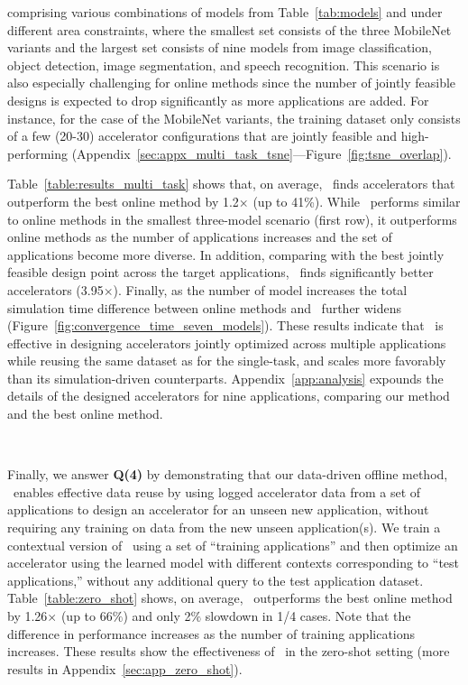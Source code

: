 %
%
comprising various combinations of models from Table~\ref{tab:models} and under different area constraints, where the smallest set consists of the three MobileNet variants and the largest set consists of nine models from image classification, object detection, image segmentation, and speech recognition.
%
This scenario is also especially challenging for online methods since the number of jointly feasible designs is expected to drop significantly as more applications are added.
%
For instance, for the case of the MobileNet variants, the training dataset only consists of a few (20-30) accelerator configurations that are jointly feasible and high-performing (Appendix~\ref{sec:appx_multi_task_tsne}---Figure~\ref{fig:tsne_overlap}). 

Table~\ref{table:results_multi_task} shows that, on average, \primemethodname\ finds accelerators that outperform the best online method by 1.2$\times$ (up to 41\%).
%
While \primemethodname\ performs similar to online methods in the smallest three-model scenario (first row), it outperforms online methods as the number of applications increases and the set of applications become more diverse.
%
In addition, comparing with the best jointly feasible design point across the target applications, \primemethodname\ finds significantly better accelerators (3.95$\times$).
%
Finally, as the number of model increases the total simulation time difference between online methods and \primemethodname\ further widens (Figure~\ref{fig:convergence_time_seven_models}).
%
These results indicate that \primemethodname\ is effective in designing accelerators jointly optimized across multiple applications while reusing the same dataset as for the single-task, and scales more favorably than its simulation-driven counterparts.
%
Appendix~\ref{app:analysis} expounds the details of the designed accelerators for nine applications, comparing our method and the best online method.

~

%
Finally, we answer \textbf{Q(4)} by demonstrating that our data-driven offline method, \primemethodname\ enables effective data reuse by using logged accelerator data from a set of applications to design an accelerator for an unseen new application, without requiring any training on data from the new unseen application(s).
%
We train a contextual version of \primemethodname\ using a set of ``training applications'' and then optimize an accelerator using the learned model with different contexts corresponding to ``test applications,'' without any additional query to the test application dataset.
%
Table~\ref{table:zero_shot} shows, on average, \primemethodname\ outperforms the best online method by 1.26$\times$ (up to 66$\%$) and only 2$\%$ slowdown in 1/4 cases.
%
Note that the difference in performance increases as the number of training applications increases.
%
These results show the effectiveness of \primemethodname\ in the zero-shot setting (more results in Appendix~\ref{sec:app_zero_shot}).

